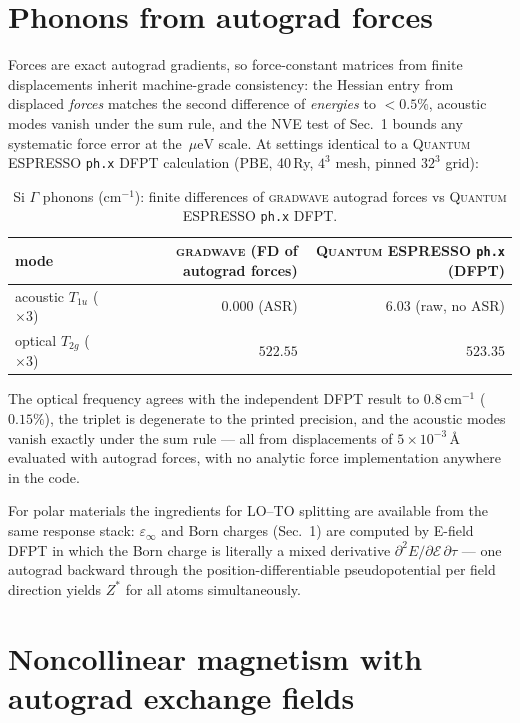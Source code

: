\documentclass[11pt]{article}
\newcommand{\gw}{\textsc{gradwave}}
\newcommand{\qe}{\textsc{Quantum ESPRESSO}}
\newcommand{\ueV}{\,\mu\mathrm{eV}}
\begin{document}
\section{Phonons from autograd forces}
\label{sec:phonons}

Forces are exact autograd gradients, so force-constant matrices from finite
displacements inherit machine-grade consistency: the Hessian entry from
displaced \emph{forces} matches the second difference of \emph{energies} to
$<0.5\%$, acoustic modes vanish under the sum rule, and the NVE test of
Sec.~1 bounds any systematic force error at the $\ueV$ scale.
At settings identical to a \qe{} \texttt{ph.x} DFPT calculation
(PBE, 40\,Ry, $4^3$ mesh, pinned $32^3$ grid):

\begin{table}[h]\centering
\caption{Si $\Gamma$ phonons (cm$^{-1}$): finite differences of \gw{}
autograd forces vs \qe{} \texttt{ph.x} DFPT.}
\begin{tabular}{lrr}
\toprule
mode & \gw{} (FD of autograd forces) & \qe{} \texttt{ph.x} (DFPT) \\
\midrule
acoustic $T_{1u}$ ($\times 3$) & $0.000$ (ASR) & $6.03$ (raw, no ASR) \\
optical $T_{2g}$ ($\times 3$)  & $522.55$ & $523.35$ \\
\bottomrule
\end{tabular}
\end{table}

The optical frequency agrees with the independent DFPT result to
$0.8$\,cm$^{-1}$ ($0.15\%$), the triplet is degenerate to the printed
precision, and the acoustic modes vanish exactly under the sum rule ---
all from displacements of $5\times10^{-3}$\,\AA{} evaluated with autograd
forces, with no analytic force implementation anywhere in the code.

For polar materials the ingredients for LO--TO splitting are available from
the same response stack: $\varepsilon_\infty$ and Born charges
(Sec.~1) are computed by E-field DFPT in which the Born charge is literally
a mixed derivative $\partial^2 E/\partial\mathcal{E}\,\partial\tau$ ---
one autograd backward through the position-differentiable pseudopotential
per field direction yields $Z^*$ for all atoms simultaneously.

\section{Noncollinear magnetism with autograd exchange fields}
\label{sec:ncl}
\end{document}
